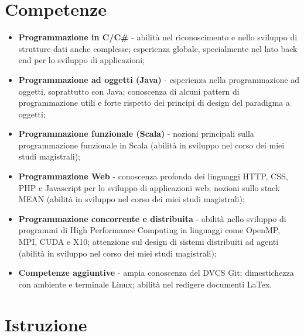 \documentclass[letterpaper]{template} %
\begin{document}
\section{Competenze}
\begin{itemize}
    \item \textbf{Programmazione in C/C\#} - abilità nel riconoscimento e nello sviluppo di strutture dati anche complesse; esperienza globale, specialmente nel lato back end per lo sviluppo di applicazioni;
    \item \textbf{Programmazione ad oggetti (Java)} - esperienza nella programmazione ad oggetti, soprattutto con Java; conoscenza di alcuni pattern di programmazione utili e forte rispetto dei principi di design del paradigma a oggetti;
    \item \textbf{Programmazione funzionale (Scala)} - nozioni principali sulla programmazione funzionale in Scala (abilità in sviluppo nel corso dei miei studi magistrali);
    \item \textbf{Programmazione Web} - conoscenza profonda dei linguaggi HTTP, CSS, PHP e Javascript per lo sviluppo di applicazioni web; nozioni sullo stack MEAN (abilità in sviluppo nel corso dei miei studi magistrali);
    \item \textbf{Programmazione concorrente e distribuita} - abilità nello sviluppo di programmi di High Performance Computing in linguaggi come OpenMP, MPI, CUDA e X10; attenzione sul design di sistemi distribuiti ad agenti (abilità in sviluppo nel corso dei miei studi magistrali);
     \item \textbf{Competenze aggiuntive} - ampia conoscenza del DVCS Git; dimestichezza con ambiente e terminale Linux; abilità nel redigere documenti LaTex.
\end{itemize}

\section{Istruzione}
\end{document}
